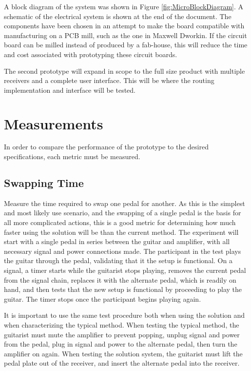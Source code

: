 \documentclass{article}
\begin{document}
	A block diagram of the system was shown in Figure \ref{fig:MicroBlockDiagram}.  A schematic of the electrical system is shown at the end of the document.  The components have been chosen in an attempt to make the board compatible with manufacturing on a PCB mill, such as the one in Maxwell Dworkin.  If the circuit board can be milled instead of produced by a fab-house, this will reduce the time and cost associated with prototyping these circuit boards.

	The second prototype will expand in scope to the full size product with multiple receivers and a complete user interface.  This will be where the routing implementation and interface will be tested.


\section{Measurements}
	In order to compare the performance of the prototype to the desired specifications, each metric must be measured.

	\subsection{Swapping Time}
	Measure the time required to swap one pedal for another.  As this is the simplest and most likely use scenario, and the swapping of a single pedal is the basis for all more complicated actions, this is a good metric for determining how much faster using the solution will be than the current method.  The experiment will start with a single pedal in series between the guitar and amplifier, with all necessary signal and power connections made.  The participant in the test plays the guitar through the pedal, validating that it the setup is functional.  On a signal, a timer starts while the guitarist stops playing, removes the current pedal from the signal chain, replaces it with the alternate pedal, which is readily on hand, and then tests that the new setup is functional by proceeding to play the guitar.  The timer stops once the participant begins playing again.

	It is important to use the same test procedure both when using the solution and when characterizing the typical method.  When testing the typical method, the guitarist must mute the amplifier to prevent popping, unplug signal and power from the pedal, plug in signal and power to the alternate pedal, then turn the amplifier on again.  When testing the solution system, the guitarist must lift the pedal plate out of the receiver, and insert the alternate pedal into the receiver.
\end{document}
